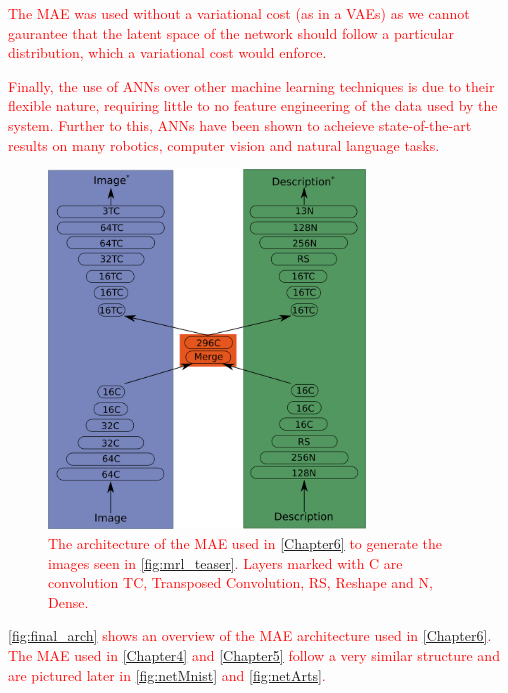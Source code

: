 \textcolor{red}{The \ac{MAE} was used without a variational cost (as in a \acp{VAE}) as we cannot gaurantee that the latent space of the network should follow a particular distribution, which a variational cost would enforce.}

\textcolor{red}{Finally, the use of \acp{ANN} over other machine learning techniques is due to their flexible nature, requiring little to no feature engineering of the data used by the system. Further to this, \acp{ANN} have been shown to acheieve state-of-the-art results on many robotics, computer vision and natural language tasks.}

\begin{figure}
\centering
\includegraphics[width=0.75\textwidth]{Figs/chapter6/maeArch.png}

\caption{\textcolor{red}{The architecture of the \ac{MAE} used in \autoref{Chapter6} to generate the images seen in \autoref{fig:mrl_teaser}. Layers marked with C are convolution TC, Transposed Convolution, RS, Reshape and N, Dense.}}
\label{fig:final_arch}
\end{figure}

\textcolor{red}{\autoref{fig:final_arch} shows an overview of the \ac{MAE} architecture used in \autoref{Chapter6}. The \ac{MAE} used in \autoref{Chapter4} and \autoref{Chapter5} follow a very similar structure and are pictured later in \autoref{fig:netMnist} and \autoref{fig:netArts}.} 











